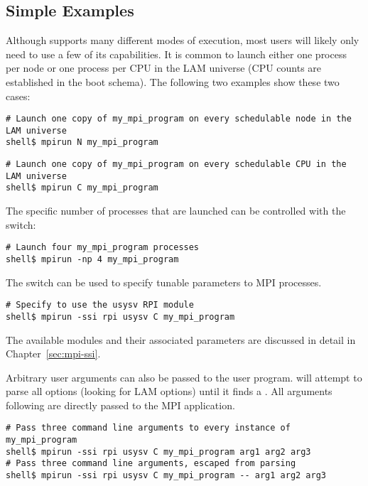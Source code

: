\subsection{Simple Examples}

Although  supports many different modes of execution, most
users will likely only need to use a few of its capabilities.  It is
common to launch either one process per node or one process per CPU in
the LAM universe (CPU counts are established in the boot schema).  The
following two examples show these two cases:

\lstset{style=lam-cmdline}
\begin{lstlisting}
# Launch one copy of my_mpi_program on every schedulable node in the LAM universe
shell$ mpirun N my_mpi_program
\end{lstlisting}

\lstset{style=lam-cmdline}
\begin{lstlisting}
# Launch one copy of my_mpi_program on every schedulable CPU in the LAM universe
shell$ mpirun C my_mpi_program
\end{lstlisting}

The specific number of processes that are launched can be controlled
with the  switch:

\lstset{style=lam-cmdline}
\begin{lstlisting}
# Launch four my_mpi_program processes
shell$ mpirun -np 4 my_mpi_program
\end{lstlisting}

The  switch can be used to specify tunable parameters to
MPI processes.

\lstset{style=lam-cmdline}
\begin{lstlisting}
# Specify to use the usysv RPI module
shell$ mpirun -ssi rpi usysv C my_mpi_program
\end{lstlisting}

The available modules and their associated parameters are discussed in
detail in Chapter~\ref{sec:mpi-ssi}.

Arbitrary user arguments can also be passed to the user program.
 will attempt to parse all options (looking for LAM
options) until it finds a \cmdarg{--}.  All arguments following
\cmdarg{--} are directly passed to the MPI application.

\lstset{style=lam-cmdline}
\begin{lstlisting}
# Pass three command line arguments to every instance of my_mpi_program
shell$ mpirun -ssi rpi usysv C my_mpi_program arg1 arg2 arg3
# Pass three command line arguments, escaped from parsing
shell$ mpirun -ssi rpi usysv C my_mpi_program -- arg1 arg2 arg3
\end{lstlisting}

